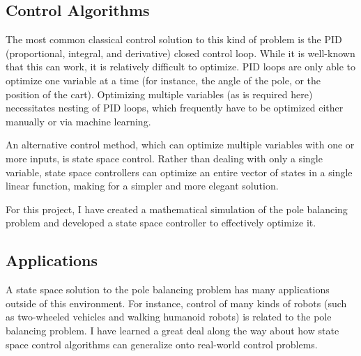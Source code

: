 \documentclass[12pt]{article}
\begin{document}
\subsection{Control Algorithms}

The most common classical control solution to this kind of problem is the PID (proportional, integral, and derivative) closed control loop. While it is well-known that this can work, it is relatively difficult to optimize. PID loops are only able to optimize one variable at a time (for instance, the angle of the pole, or the position of the cart). Optimizing multiple variables (as is required here) necessitates nesting of PID loops, which frequently have to be optimized either manually or via machine learning.

An alternative control method, which can optimize multiple variables with one or more inputs, is state space control. Rather than dealing with only a single variable, state space controllers can optimize an entire vector of states in a single linear function, making for a simpler and more elegant solution.

For this project, I have created a mathematical simulation of the pole balancing problem and developed a state space controller to effectively optimize it.

\subsection{Applications}

A state space solution to the pole balancing problem has many applications outside of this environment. For instance, control of many kinds of robots (such as two-wheeled vehicles and walking humanoid robots) is related to the pole balancing problem. I have learned a great deal along the way about how state space control algorithms can generalize onto real-world control problems.
\end{document}
